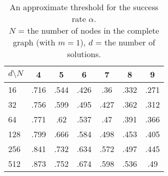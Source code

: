 \begin{table}[h]
\centering
\begin{tabular}{l||c|c|c|c|c|c|}$d\setminus N$&
4&
5&
6&
7&
8&9\\ \hline
16&
.716&
.544&
.426&
.36&
.332&
.271\\
32&
.756&
.599&
.495&
.427&
.362&
.312\\
64&
.771&
.62&
.537&
.47&
.391&
.366\\
128&
.799&
.666&
.584&
.498&
.453&
.405\\
256&
.841&
.732&
.634&
.572&
.497&
.445\\
512&
.873&
.752&
.674&
.598&
.536&
.49\\
\end{tabular}\caption{
An approximate threshold for the success rate $\alpha$.\\
$N$ = the number of nodes in the complete graph (with $m=1$), 
$d$ = the number of solutions.    
}\label{table:alpha-threshold-simulated}
\end{table}